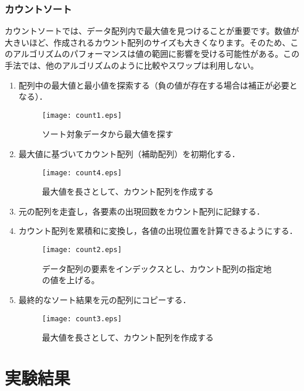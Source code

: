 \documentclass[a4j, 12pt]{jarticle}
\begin{document}
\subsubsection{カウントソート}
カウントソートでは、データ配列内で最大値を見つけることが重要です。数値が大きいほど、作成されるカウント配列のサイズも大きくなります。そのため、このアルゴリズムのパフォーマンスは値の範囲に影響を受ける可能性がある。この手法では、他のアルゴリズムのように比較やスワップは利用しない\cite{gfg:countingsort2024}。\
\begin{enumerate}
  \item 配列中の最大値と最小値を探索する（負の値が存在する場合は補正が必要となる）．
  \begin{figure}[H]
    \centering
    \texttt{[image: count1.eps]}
    \caption{ソート対象データから最大値を探す}
  \end{figure}
  \item 最大値に基づいてカウント配列（補助配列）を初期化する．
  \begin{figure}[H]
    \centering
    \texttt{[image: count4.eps]}
    \caption{最大値を長さとして、カウント配列を作成する}
  \end{figure}
  \item 元の配列を走査し，各要素の出現回数をカウント配列に記録する．
  \item カウント配列を累積和に変換し，各値の出現位置を計算できるようにする．
  \begin{figure}[H]
    \centering
    \texttt{[image: count2.eps]}
    \caption{データ配列の要素をインデックスとし、カウント配列の指定地の値を上げる。}
  \end{figure}
  \newpage
  \item 最終的なソート結果を元の配列にコピーする．
  \begin{figure}[H]
    \centering
    \texttt{[image: count3.eps]}
    \caption{最大値を長さとして、カウント配列を作成する}
  \end{figure}
\end{enumerate}
\newpage
\section{実験結果}
\end{document}
